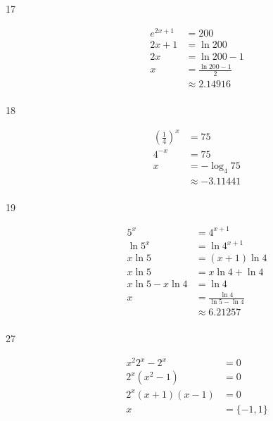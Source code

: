 \documentclass{exam}
\begin{document}
\begin{description}
      \item[17]
        \begin{align*}
          e^{2x + 1} &= 200 \\
          2x + 1     &= \ln 200 \\
          2x         &= \ln 200 - 1 \\
          x          &= \frac{\ln 200 - 1}{2} \\
                     &\approx 2.14916 \\
        \end{align*}

      \item[18]
        \begin{align*}
          \left( \frac{1}{4} \right)^x &= 75 \\
          4^{-x}                       &= 75 \\
          x                            &= -\log_4 75 \\
                                       &\approx -3.11441 \\
        \end{align*}

      \item[19]
        \begin{align*}
          5^x               &= 4^{x + 1} \\
          \ln 5^x           &= \ln 4^{x + 1} \\
          x \ln 5           &= (x  + 1) \ln 4 \\
          x \ln 5           &= x \ln 4 + \ln 4 \\
          x \ln 5 - x \ln 4 &= \ln 4 \\
          x                 &= \frac{\ln 4}{\ln 5 - \ln 4} \\
                            &\approx 6.21257 \\
        \end{align*}

      \item[27]
        \begin{align*}
          x^2 2^x - 2^x              &= 0 \\
          2^x \left( x^2 - 1 \right) &= 0 \\
          2^x(x + 1)(x - 1)          &= 0 \\
          x                          &= \boxed{ \{ -1, 1 \} } \\
        \end{align*}


\end{description}
\end{document}
